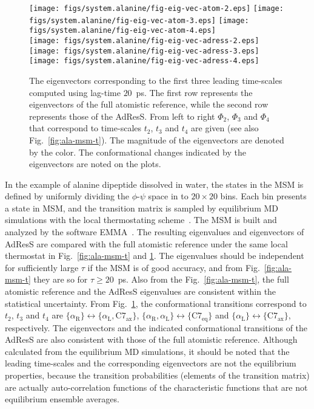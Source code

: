 \documentclass[epjST]{svjour}
\newcommand{\confa}[0]{{\alpha_{\textrm{R}}}}
\newcommand{\confb}[0]{{\textrm{C}7_{\textrm{eq}}}}
\newcommand{\confc}[0]{{\alpha_{\textrm{L}}}}
\newcommand{\confd}[0]{{\textrm{C}7_{\textrm{ax}}}}
\begin{document}
\begin{figure}
  \centering
  \texttt{[image: figs/system.alanine/fig-eig-vec-atom-2.eps]}
  \texttt{[image: figs/system.alanine/fig-eig-vec-atom-3.eps]}
  \texttt{[image: figs/system.alanine/fig-eig-vec-atom-4.eps]}\\[-.4cm]
  \texttt{[image: figs/system.alanine/fig-eig-vec-adress-2.eps]}
  \texttt{[image: figs/system.alanine/fig-eig-vec-adress-3.eps]}
  \texttt{[image: figs/system.alanine/fig-eig-vec-adress-4.eps]}\\
  \caption{The eigenvectors corresponding to the first three leading time-scales computed using lag-time $20$~ps.
    The first row represents the eigenvectors of the full atomistic reference, while the second
    row represents those of the AdResS. From left to right $\Phi_2$, $\Phi_3$ and $\Phi_4$ that correspond to
    time-scales $t_2$, $t_3$ and $t_4$ are given (see also Fig.~\ref{fig:ala-msm-t}). The magnitude of the eigenvectors are
    denoted by the color. 
    The conformational
    changes indicated by the eigenvectors are noted on the plots.}
  \label{fig:ala-msm-v}
\end{figure}


In the example of alanine dipeptide dissolved in water, the states in the MSM
is defined by uniformly dividing the $\phi$-$\psi$ space in to $20\times 20$ bins.
Each bin presents a state in MSM, and the transition matrix is sampled by equilibrium
MD simulations with the local thermostating scheme~\cite{wang2014exploring}.
The MSM is built and analyzed by the software EMMA~\cite{senne2012emma}.
The resulting eigenvalues and eigenvectors of AdResS are compared with the full atomistic reference under the same local thermostat in
Fig.~\ref{fig:ala-msm-t} and \ref{fig:ala-msm-v}. The
eigenvalues should be independent for sufficiently large $\tau$ if the MSM is of good
accuracy, and from Fig.~\ref{fig:ala-msm-t} they are so for $\tau \geq 20$~ps.
Also from the Fig.~\ref{fig:ala-msm-t}, the full atomistic
reference and the AdResS eigenvalues are consistent within the statistical
uncertainty.
From Fig.~\ref{fig:ala-msm-v}, the conformational transitions correspond
to $t_2$, $t_3$ and $t_4$ are $\{\confa \} \leftrightarrow \{\confc,\confd\}$,
$\{\confa, \confc \} \leftrightarrow \{\confb\}$ and $\{\confc \} \leftrightarrow \{\confd\}$, respectively.
The eigenvectors and the indicated conformational transitions of the AdResS are also consistent with
those of the full atomistic reference. Although calculated from the
equilibrium MD simulations, it should be noted that the leading time-scales and the
corresponding eigenvectors are not the equilibrium properties, because
the transition probabilities (elements of the transition matrix) are actually
auto-correlation functions of the characteristic functions that are not equilibrium ensemble averages.
\end{document}
